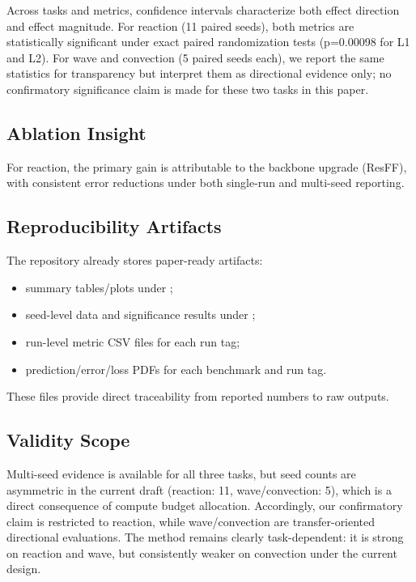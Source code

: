

Across tasks and metrics, confidence intervals characterize both effect direction and effect magnitude. For reaction (11 paired seeds), both metrics are statistically significant under exact paired randomization tests (p=0.00098 for L1 and L2). For wave and convection (5 paired seeds each), we report the same statistics for transparency but interpret them as directional evidence only; no confirmatory significance claim is made for these two tasks in this paper.

\subsection{Ablation Insight}
For reaction, the primary gain is attributable to the backbone upgrade (ResFF), with consistent error reductions under both single-run and multi-seed reporting.

\subsection{Reproducibility Artifacts}
The repository already stores paper-ready artifacts:
\begin{itemize}
  \item summary tables/plots under ;
  \item seed-level data and significance results under ;
  \item run-level metric CSV files for each run tag;
  \item prediction/error/loss PDFs for each benchmark and run tag.
\end{itemize}

These files provide direct traceability from reported numbers to raw outputs.

\subsection{Validity Scope}
Multi-seed evidence is available for all three tasks, but seed counts are asymmetric in the current draft (reaction: 11, wave/convection: 5), which is a direct consequence of compute budget allocation. Accordingly, our confirmatory claim is restricted to reaction, while wave/convection are transfer-oriented directional evaluations. The method remains clearly task-dependent: it is strong on reaction and wave, but consistently weaker on convection under the current design.
